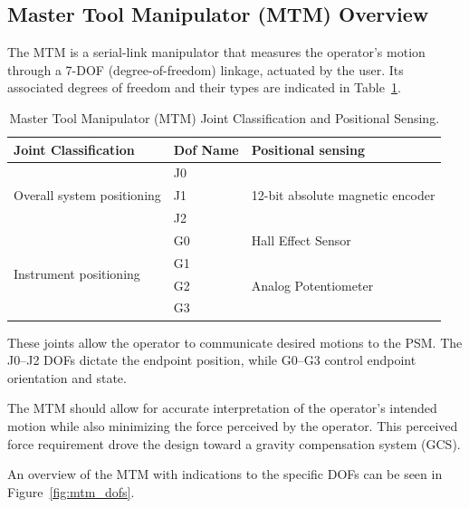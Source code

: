 \subsection{Master Tool Manipulator (MTM) Overview}

The MTM is a serial-link manipulator that measures the operator's motion through a 7-DOF (degree-of-freedom) linkage, actuated by the user. Its associated degrees of freedom and their types are indicated in Table~\ref{tab:mtm_dofs_detailed}.

\begin{table}[htb!] %
    \centering
    \caption{Master Tool Manipulator (MTM) Joint Classification and Positional Sensing.}
    \label{tab:mtm_dofs_detailed}
    \begin{tabular}{|l|l|l|}
    \hline
    \textbf{Joint Classification} & \textbf{Dof Name} & \textbf{Positional sensing} \\
    \hline
    \multirow{3}{*}{Overall system positioning} & J0 & \multirow{3}{*}{12-bit absolute magnetic encoder} \\
    & J1 & \\
    & J2 & \\
    \hline
    \multirow{4}{*}{Instrument positioning} & G0 & Hall Effect Sensor \\
    \cline{2-3}
    & G1 & \multirow{3}{*}{Analog Potentiometer} \\
    & G2 & \\
    & G3 & \\
    \hline
    \end{tabular}
\end{table}

These joints allow the operator to communicate desired motions to the PSM. The J0--J2 DOFs dictate the endpoint position, while G0--G3 control endpoint orientation and state.

The MTM should allow for accurate interpretation of the operator's intended motion while also minimizing the force perceived by the operator. This perceived force requirement drove the design toward a gravity compensation system (GCS).

An overview of the MTM with indications to the specific DOFs can be seen in Figure~\ref{fig:mtm_dofs}.

